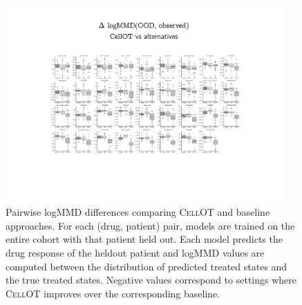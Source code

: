 \begin{figure}[h]
  \begin{center}
    \includegraphics[width=0.95\textwidth]{figures/cellot-cohort/ood-eval-logmmd.pdf}
  \end{center}
  \caption{
    Pairwise logMMD differences comparing \textsc{CellOT} and baseline approaches.
    For each (drug, patient) pair, models are trained on the entire cohort with that patient held out.
    Each model predicts the drug response of the heldout patient
    and logMMD values are computed between the distribution of predicted treated states and the true treated states.
    Negative values correspond to settings where \textsc{CellOT} improves over the corresponding baseline.
  }
\label{fig:ood-eval-logmmd}
\end{figure}

